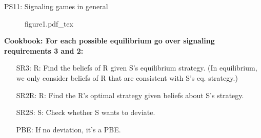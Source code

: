 \begin{frame}{PS11: Signaling games in general}
\begin{multicols}{2}
\begin{itemize}
      \end{itemize}
      \vfill\null\columnbreak
      \begin{figure}[!h]
        \center
        \def\svgwidth{\columnwidth}
        {figure1.pdf_tex}
      \end{figure} \vspace{-6pt}
      \textbf{Cookbook: For each possible equilibrium go over signaling requirements 3 and 2:}\vspace{-6pt}
      \begin{itemize}
        \item[SR3:] R: Find the beliefs of R given S's equilibrium strategy. (In equilibrium, we only consider beliefs of R that are consistent with S's eq. strategy.)
        \item[SR2R:] \vspace{-2pt} R: Find the R's optimal strategy given beliefs about S's strategy.
        \item[SR2S:] \vspace{-2pt} S: Check whether S wants to deviate.
        \item[PBE:] \vspace{-2pt} If no deviation, it's a PBE.
      \end{itemize}
      \vfill\null
    \end{multicols}
\end{frame}
